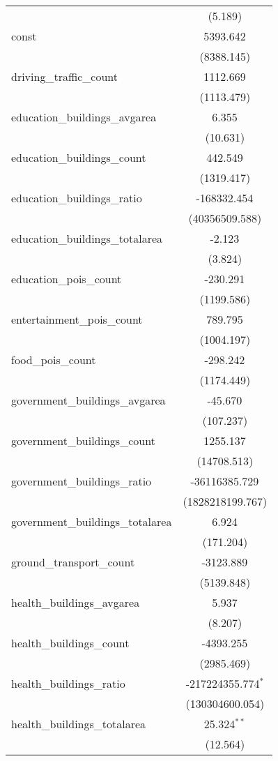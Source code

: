 \begin{table}[!htbp]
\begin{tabular}{@{\extracolsep{5pt}}lc}
  & (5.189) \\
 const & 5393.642$^{}$ \\
  & (8388.145) \\
 driving_traffic_count & 1112.669$^{}$ \\
  & (1113.479) \\
 education_buildings_avgarea & 6.355$^{}$ \\
  & (10.631) \\
 education_buildings_count & 442.549$^{}$ \\
  & (1319.417) \\
 education_buildings_ratio & -168332.454$^{}$ \\
  & (40356509.588) \\
 education_buildings_totalarea & -2.123$^{}$ \\
  & (3.824) \\
 education_pois_count & -230.291$^{}$ \\
  & (1199.586) \\
 entertainment_pois_count & 789.795$^{}$ \\
  & (1004.197) \\
 food_pois_count & -298.242$^{}$ \\
  & (1174.449) \\
 government_buildings_avgarea & -45.670$^{}$ \\
  & (107.237) \\
 government_buildings_count & 1255.137$^{}$ \\
  & (14708.513) \\
 government_buildings_ratio & -36116385.729$^{}$ \\
  & (1828218199.767) \\
 government_buildings_totalarea & 6.924$^{}$ \\
  & (171.204) \\
 ground_transport_count & -3123.889$^{}$ \\
  & (5139.848) \\
 health_buildings_avgarea & 5.937$^{}$ \\
  & (8.207) \\
 health_buildings_count & -4393.255$^{}$ \\
  & (2985.469) \\
 health_buildings_ratio & -217224355.774$^{*}$ \\
  & (130304600.054) \\
 health_buildings_totalarea & 25.324$^{**}$ \\
  & (12.564) \\

\end{tabular}
\end{table}
